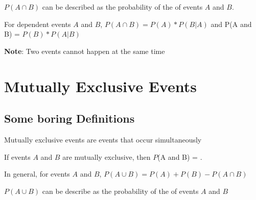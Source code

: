 \begin{definition}
    $P(A \cap B)$ can be described as the probability of the  of events $A$ and $B$.
\end{definition}

\begin{definition}
    For dependent events $A$ and $B$, $P(A \cap B) = P(A) * P(B | A)$ and P(A and B) = $P(B) * P(A|B)$
\end{definition}

\begin{blueblock}
    \textbf{Note}: Two events cannot happen at the same time
\end{blueblock}

\section{Mutually Exclusive Events}
\subsection{Some boring Definitions}
\begin{definition}
    Mutually exclusive events are events that  occur simultaneously
\end{definition}
\begin{definition}
    If events $A$ and $B$ are mutually exclusive, then $P$(A and B) = .
\end{definition}
\begin{definition}
    In general, for events $A$ and $B$, $P(A \cup B) = P(A) + P(B) - P(A \cap B)$
\end{definition} 
\begin{definition}
    $P(A \cup B)$ can be describe as the probability of the  of events $A$ and $B$
\end{definition}
